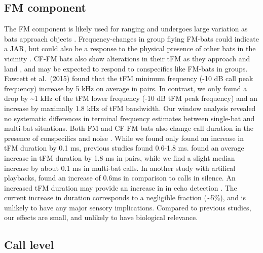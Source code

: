 \documentclass[
]{book}
\begin{document}
\hypertarget{fm-component}{%
\subsection{FM component}\label{fm-component}}

The FM component is likely used for ranging and undergoes large variation as bats approach objects \citep{Fenton2014}. Frequency-changes in group flying FM-bats could indicate a JAR, but could also be a response to the physical presence of other bats in the vicinity \citep{cvikel2015b, fawcett2015clutter}. CF-FM bats also show alterations in their tFM as they approach and land \citep{tian1997echolocation, schoeppler2018precise, Fenton2014}, and may be expected to respond to conspecifics like FM-bats in groups. Fawcett et al.~(2015) found that the tFM minimum frequency (-10 dB call peak frequency) increase by 5 kHz on average in pairs. In contrast, we only found a drop by \textasciitilde1 kHz of the tFM lower frequency (-10 dB tFM peak frequency) and an increase by maximally 1.8 kHz of tFM bandwidth. Our window analysis revealed no systematic differences in terminal frequency estimates between single-bat and multi-bat situations. Both FM and CF-FM bats also change call duration in the presence of conspecifics and noise \citep[\citet{gomes2020individual}]{cvikel2015b, amichai2015calling, fawcett2015echolocation, lu2020echolocating}. While we found only found an increase in tFM duration by 0.1 ms, previous studies found 0.6-1.8 ms. \citet{fawcett2015echolocation} found an average increase in tFM duration by 1.8 ms in pairs, while we find a slight median increase by about 0.1 ms in multi-bat calls. In another study with artifical playbacks, \citet{lu2020echolocating} found an increase of 0.6ms in comparison to calls in silence. An increased tFM duration may provide an increase in in echo detection \citep{amichai2015calling, luo2015linking}. The current increase in duration corresponds to a negligible fraction (\textasciitilde5\%), and is unlikely to have any major sensory implications. Compared to previous studies, our effects are small, and unlikely to have biological relevance.

\hypertarget{call-level}{%
\subsection{Call level}\label{call-level}}
\end{document}
